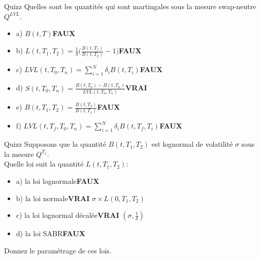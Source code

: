 \documentclass{beamer}
\begin{document}
\begin{frame}{Quizz}
Quelles sont les quantités qui sont martingales sous la mesure swap-neutre $Q^{LVL}$.
\begin{itemize}
\item a) $B(t,T)$\textbf{\color{red}FAUX}
\item b) $L(t,T_1,T_2)=\frac{1}{\delta}\big(\frac{B(t,T_1)}{B(t,T_2)}-1 \big)$\textbf{\color{red}FAUX}
\item c) $\displaystyle LVL(t,T_0,T_n)=\sum_{i=1}^{N}\delta_i B(t,T_i)$\textbf{\color{red}FAUX}
\item d) $S(t,T_0,T_n)=\frac{B(t,T_0)-B(t,T_n)}{LVL(t,T_0,T_n)}$\textbf{\color{green}VRAI}
\item e) $B(t,T_1,T_2)=\frac{B(t,T_2)}{B(t,T_1)}$\textbf{\color{red}FAUX} 
\item f) $\displaystyle LVL(t,T_f,T_0,T_n)=\sum_{i=1}^{N}\delta_i B(t,T_f,T_i)$\textbf{\color{red}FAUX}
\end{itemize}
\end{frame}

\begin{frame}{Quizz}
Supposons que la quantité $B(t,T_1,T_2)$ est lognormal de volatilité $\sigma$ sous la mesure $Q^{T_1}$.\\
\vspace{0.5cm}
Quelle loi suit la quantité $L(t,T_1,T_2):$
\begin{itemize}
\item a) la loi lognormale\textbf{\color{red}FAUX}
\item b) la loi normale\textbf{\color{green}VRAI} $\sigma \times L(0,T_1,T_2) $ 
\item c) la loi lognormal décalée\textbf{\color{green}VRAI} $(\sigma,\frac{1}{\delta})$
\item d) la loi SABR\textbf{\color{red}FAUX}
\end{itemize}
\vspace{0.5cm}
Donnez le paramétrage de ces lois.
\end{frame}
\end{document}
